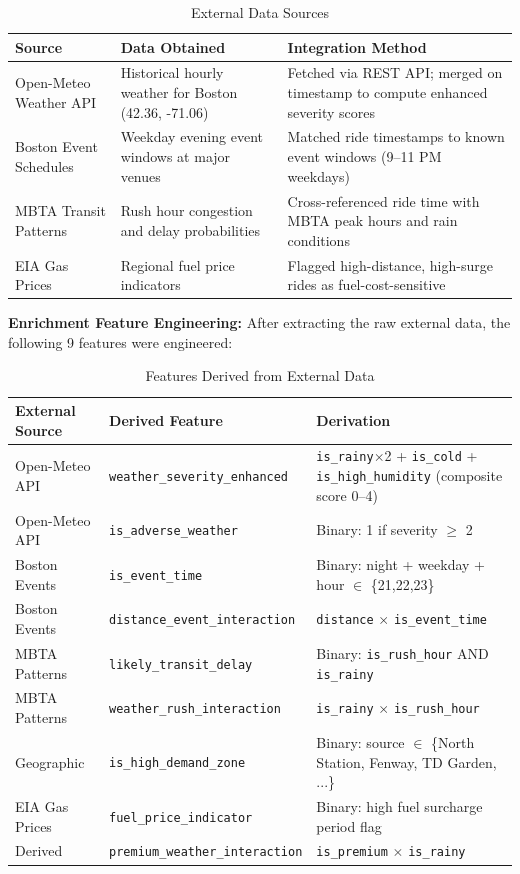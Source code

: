 \documentclass[12pt,a4paper]{article}
\begin{document}
\begin{table}[H]
\centering
\caption{External Data Sources}
\footnotesize
\begin{tabular}{llp{7cm}}
\toprule
\textbf{Source} & \textbf{Data Obtained} & \textbf{Integration Method} \\
\midrule
Open-Meteo Weather API & Historical hourly weather for Boston (42.36, -71.06) & Fetched via REST API; merged on timestamp to compute enhanced severity scores \\
Boston Event Schedules & Weekday evening event windows at major venues & Matched ride timestamps to known event windows (9--11 PM weekdays) \\
MBTA Transit Patterns & Rush hour congestion and delay probabilities & Cross-referenced ride time with MBTA peak hours and rain conditions \\
EIA Gas Prices & Regional fuel price indicators & Flagged high-distance, high-surge rides as fuel-cost-sensitive \\
\bottomrule
\end{tabular}
\end{table}

\textbf{Enrichment Feature Engineering:} After extracting the raw external data, the following 9 features were engineered:

\begin{table}[H]
\centering
\caption{Features Derived from External Data}
\footnotesize
\begin{tabular}{llp{6.5cm}}
\toprule
\textbf{External Source} & \textbf{Derived Feature} & \textbf{Derivation} \\
\midrule
Open-Meteo API & \texttt{weather\_severity\_enhanced} & \texttt{is\_rainy}$\times$2 + \texttt{is\_cold} + \texttt{is\_high\_humidity} (composite score 0--4) \\
Open-Meteo API & \texttt{is\_adverse\_weather} & Binary: 1 if severity $\geq$ 2 \\
\addlinespace
Boston Events & \texttt{is\_event\_time} & Binary: night + weekday + hour $\in$ \{21,22,23\} \\
Boston Events & \texttt{distance\_event\_interaction} & \texttt{distance} $\times$ \texttt{is\_event\_time} \\
\addlinespace
MBTA Patterns & \texttt{likely\_transit\_delay} & Binary: \texttt{is\_rush\_hour} AND \texttt{is\_rainy} \\
MBTA Patterns & \texttt{weather\_rush\_interaction} & \texttt{is\_rainy} $\times$ \texttt{is\_rush\_hour} \\
\addlinespace
Geographic & \texttt{is\_high\_demand\_zone} & Binary: source $\in$ \{North Station, Fenway, TD Garden, ...\} \\
EIA Gas Prices & \texttt{fuel\_price\_indicator} & Binary: high fuel surcharge period flag \\
Derived & \texttt{premium\_weather\_interaction} & \texttt{is\_premium} $\times$ \texttt{is\_rainy} \\
\bottomrule
\end{tabular}
\end{table}
\end{document}
